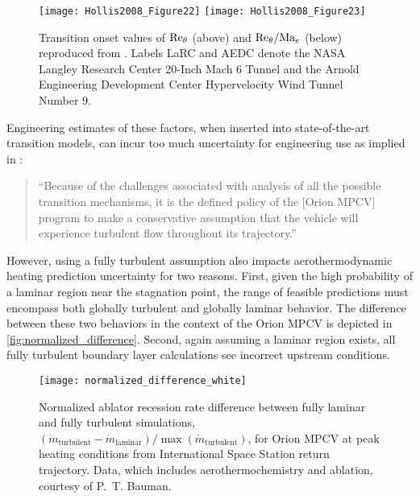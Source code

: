 \begin{figure}
  \centering
  \texttt{[image: Hollis2008\_Figure22]}
  \vfill
  \texttt{[image: Hollis2008\_Figure23]}
  \caption[
      Transition onset values of {$\Reynolds[\theta]{}$} and
      {$\Reynolds[\theta]{} / \Mach[e]{}$} from wind tunnel experiments
      using an Orion MPCV scale model.
  ]{%
      Transition onset values of $\Reynolds[\theta]{}$ (above) and
      $\Reynolds[\theta]{} / \Mach[e]{}$ (below) reproduced from
      \citet{Hollis2008Aeroheating}.  Labels LaRC and AEDC denote the
      NASA Langley Research Center 20-Inch Mach 6 Tunnel and the Arnold
      Engineering Development Center Hypervelocity Wind Tunnel Number 9.
      \label{fig:hollis_transition_onset}
  }
\end{figure}

Engineering estimates of these factors, when inserted into state-of-the-art
transition models, can incur too much uncertainty for engineering use as
\citet{Hollis2008Aeroheating} implied in \citeyear{Hollis2008Aeroheating}:
\begin{quote}
  ``Because of the challenges associated with analysis of all the possible
  transition mechanisms, it is the defined policy of the [Orion MPCV]
  program to make a conservative assumption that the vehicle will
  experience turbulent flow throughout its trajectory.''
\end{quote}
However, using a fully turbulent assumption also impacts aerothermodynamic
heating prediction uncertainty for two reasons.  First, given the high
probability of a laminar region near the stagnation point, the range of feasible
predictions must encompass both globally turbulent and globally laminar
behavior.  The difference between these two behaviors in the context of the
Orion MPCV is depicted in \autoref{fig:normalized_difference}.  Second, again
assuming a laminar region exists, all fully turbulent boundary layer
calculations see incorrect upstream conditions.

\begin{figure}[tb]
  \centering
  \texttt{[image: normalized\_difference\_white]}
  \caption[
    Normalized ablator recession rate difference between fully laminar and fully
    turbulent simulations for Orion MPCV at peak heating conditions from
    International Space Station return trajectory.
  ]{%
    \label{fig:normalized_difference}
    Normalized ablator recession rate difference
    between fully laminar and fully turbulent simulations,
    $\left(\dot{m}_\text{turbulent} - \dot{m}_\text{laminar}\right)
    / \max\left(\dot{m}_\text{turbulent}\right)$, for Orion MPCV at
    peak heating conditions from International Space Station return trajectory.
    Data, which includes aerothermochemistry and ablation, courtesy of P.~T.
    Bauman.
  }
\end{figure}

